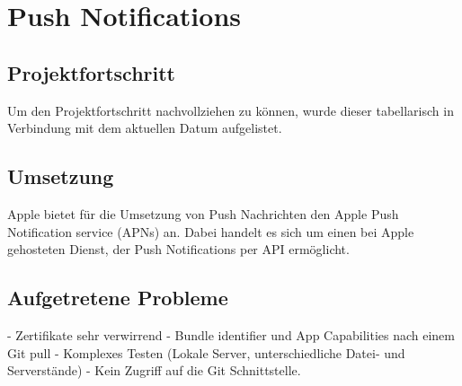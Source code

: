 \chapter{Push Notifications}



\section{Projektfortschritt}
Um den Projektfortschritt nachvollziehen zu können, wurde dieser tabellarisch in Verbindung mit dem aktuellen Datum aufgelistet.\\


\newpage
\section{Umsetzung}

Apple bietet für die Umsetzung von Push Nachrichten den Apple Push Notification service (APNs) an. Dabei handelt es sich um einen bei Apple gehosteten Dienst, der Push Notifications per API ermöglicht.


\section{Aufgetretene Probleme}
- Zertifikate sehr verwirrend
- Bundle identifier und App Capabilities nach einem Git pull
- Komplexes Testen (Lokale Server, unterschiedliche Datei- und Serverstände) 
- Kein Zugriff auf die Git Schnittstelle.